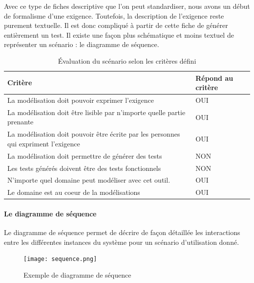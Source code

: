         Avec ce type de fiches descriptive que l'on peut standardiser, nous avons un début de formalisme d'une exigence. Toutefois, la description de l'exigence reste purement textuelle. Il est donc compliqué à partir de cette fiche de générer entièrement un test. Il existe une façon plus schématique et moins textuel de représenter un scénario : le diagramme de séquence.
        \begin{table}[H]
        \centering
         \begin{tabular}{|p{25em}|p{5em}|} 
         \hline
        Critère & Répond au critère \\ [0.5ex] 
         \hline
         La modélisation doit pouvoir exprimer l’exigence & \cellcolor[HTML]{699A73}OUI\\
         \hline
        La modélisation doit être lisible par n’importe quelle partie prenante & \cellcolor[HTML]{699A73}OUI\\
         \hline
        La modélisation doit pouvoir être écrite par les personnes qui expriment l’exigence &\cellcolor[HTML]{699A73} OUI \\
         \hline
        La modélisation doit permettre de générer des tests & \cellcolor[HTML]{D03737}NON \\
         \hline
        Les tests générés doivent être des tests fonctionnels &\cellcolor[HTML]{D03737} NON\\ 
         \hline
        N’importe quel domaine peut modéliser avec cet outil.&\cellcolor[HTML]{699A73} OUI\\ 
         \hline
        Le domaine est au coeur de la modélisations &\cellcolor[HTML]{699A73} OUI\\ 
        \hline 
        \end{tabular}
        \caption{Évaluation du scénario selon les critères défini}
        \end{table}
    
        \paragraph{Le diagramme de séquence}

        Le diagramme de séquence permet de décrire de façon détaillée les interactions entre les différentes instances du système pour un scénario d'utilisation donné. 
        
            \begin{figure}[H]
                \centering
                \texttt{[image: sequence.png]}
                \caption{Exemple de diagramme de séquence}
            \end{figure}
        
